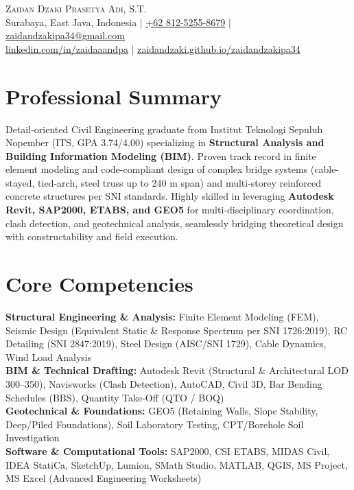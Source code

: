 \documentclass[letterpaper,10pt]{article}
\begin{document}
\begin{center}
    {\Huge \scshape Zaidan Dzaki Prasetya Adi, S.T.} \\ \vspace{3pt}
    \small Surabaya, East Java, Indonesia $|$ \href{tel:+6281252558679}{+62 812-5255-8679} $|$ \href{mailto:zaidandzakipa34@gmail.com}{\underline{zaidandzakipa34@gmail.com}} \\
    \href{https://linkedin.com/in/zaidaaandpa}{\underline{linkedin.com/in/zaidaaandpa}} $|$ 
    \href{https://zaidandzaki.github.io/zaidandzakipa34/}{\underline{zaidandzaki.github.io/zaidandzakipa34}}
\end{center}

\section{Professional Summary}
\small{
Detail-oriented Civil Engineering graduate from Institut Teknologi Sepuluh Nopember (ITS, GPA 3.74/4.00) specializing in \textbf{Structural Analysis and Building Information Modeling (BIM)}. Proven track record in finite element modeling and code-compliant design of complex bridge systems (cable-stayed, tied-arch, steel truss up to 240 m span) and multi-storey reinforced concrete structures per SNI standards. Highly skilled in leveraging \textbf{Autodesk Revit, SAP2000, ETABS, and GEO5} for multi-disciplinary coordination, clash detection, and geotechnical analysis, seamlessly bridging theoretical design with constructability and field execution.
}

\section{Core Competencies}
\begin{itemize}[leftmargin=0.15in, label={}]
    \small{\item{
     \textbf{Structural Engineering \& Analysis:} Finite Element Modeling (FEM), Seismic Design (Equivalent Static \& Response Spectrum per SNI 1726:2019), RC Detailing (SNI 2847:2019), Steel Design (AISC/SNI 1729), Cable Dynamics, Wind Load Analysis \\
     \textbf{BIM \& Technical Drafting:} Autodesk Revit (Structural \& Architectural LOD 300--350), Navisworks (Clash Detection), AutoCAD, Civil 3D, Bar Bending Schedules (BBS), Quantity Take-Off (QTO / BOQ) \\
     \textbf{Geotechnical \& Foundations:} GEO5 (Retaining Walls, Slope Stability, Deep/Piled Foundations), Soil Laboratory Testing, CPT/Borehole Soil Investigation \\
     \textbf{Software \& Computational Tools:} SAP2000, CSI ETABS, MIDAS Civil, IDEA StatiCa, SketchUp, Lumion, SMath Studio, MATLAB, QGIS, MS Project, MS Excel (Advanced Engineering Worksheets)
    }}
\end{itemize}
\end{document}
